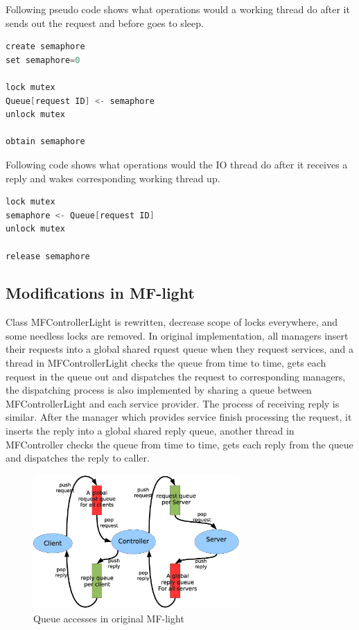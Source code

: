 \documentclass[a4paper,10pt]{article}
\begin{document}
Following pseudo code shows what operations would a working thread do after it sends out the request and before goes to sleep.

\begin{lstlisting}[language=C]
create semaphore
set semaphore=0

lock mutex
Queue[request ID] <- semaphore
unlock mutex

obtain semaphore
\end{lstlisting}

Following code shows what operations would the IO thread do after it receives a reply and wakes corresponding working thread up.

\begin{lstlisting}[language=C]
lock mutex
semaphore <- Queue[request ID]
unlock mutex

release semaphore
\end{lstlisting}

\subsection{Modifications in MF-light}
Class MFControllerLight is rewritten, decrease scope of locks everywhere, and some needless locks are removed.
In original implementation, all managers insert their requests into a global shared rquest queue when they request services, and a thread in MFControllerLight checks the queue from time to time,
gets each request in the queue out and dispatches the request to corresponding managers, the dispatching process is also implemented by sharing a queue between MFControllerLight and each service provider.
The process of receiving reply is similar. After the manager which provides service finish processing the request, it inserts the reply into a global shared reply queue, another thread in MFController checks
the queue from time to time, gets each reply from the queue and dispatches the reply to caller. 

\begin{figure}[!ht]\centering
  \includegraphics[width=0.7\textwidth]{mf-light-orig.eps}
  \caption{ Queue accesses in original MF-light}\label{fig:mf-light-orig}
\end{figure}
\end{document}

